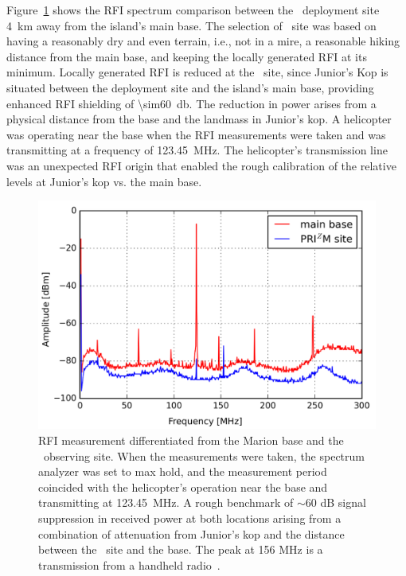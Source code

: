 Figure~\ref{fig:rfi} shows the RFI spectrum comparison between the \prizm\ deployment site \SI{4}{\kilo\metre} away from the island's main base. The selection of \prizm\ site was based on having a reasonably dry and even terrain, i.e., not in a mire, a reasonable hiking distance from the main base, and keeping the locally generated RFI at its minimum. Locally generated RFI is reduced at the \prizm\ site, since Junior's Kop is situated between the deployment site and the island's main base, providing enhanced RFI shielding of \SI{\sim60}{\decibel}. The reduction in power arises from a physical distance from the base and the landmass in Junior's kop. A helicopter was operating near the base when the RFI measurements were taken and was transmitting at a frequency of \SI{123.45}{\mega\hertz}. The helicopter's transmission line was an unexpected RFI origin that enabled the rough calibration of the relative levels at Junior's kop vs. the main base.

\begin{figure}
	\centering
	\includegraphics[width=\linewidth]{Figures/rfi}
	\caption{RFI measurement differentiated from the Marion base and the \prizm\ observing site. When the measurements were taken, the spectrum analyzer was set to max hold, and the measurement period coincided with the helicopter's operation near the base and transmitting at \SI{123.45}{\mega\hertz}. A rough benchmark of $\sim$60 dB signal suppression in received power at both locations arising from a combination of attenuation from Junior's kop and the distance between the \prizm\ site and the base. The peak at 156 MHz is a transmission from a handheld radio~\citep{2019JAI.....850004P}.}
	\label{fig:rfi}
\end{figure}

